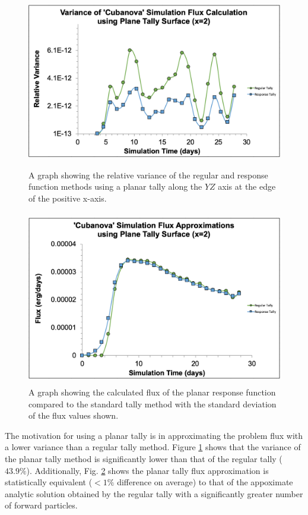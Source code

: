 \documentclass[]{article}
\begin{document}
		\begin{figure} [h!]
			\centering
			\includegraphics[height=3in]{Figures/plane_response_var.png}
			\caption{A graph showing the relative variance of the regular and response function methods using a planar tally along the $YZ$ axis at the edge of the positive x-axis.}
			\label{fig:plane_response_var}
		\end{figure}
		
		\begin{figure} [h!]
			\centering
			\includegraphics[height=3in]{Figures/plane_avg_error.png}
			\caption{A graph showing the calculated flux of the planar response function compared to the standard tally method with the standard deviation of the flux values shown. }
			\label{fig:plane_avg_flux}
		\end{figure}
		
		The motivation for using a planar tally is in approximating the problem flux with a lower variance than a regular tally method. Figure \ref{fig:plane_response_var} shows that the variance of the planar tally method is significantly lower than that of the regular tally ($43.9\%$).  Additionally, Fig. \ref{fig:plane_avg_flux} shows the planar tally flux approximation is statistically equivalent ($<1\%$ difference on average) to that of the appoximate analytic solution obtained by the regular tally with a significantly greater number of forward particles. 
		
\end{document}
